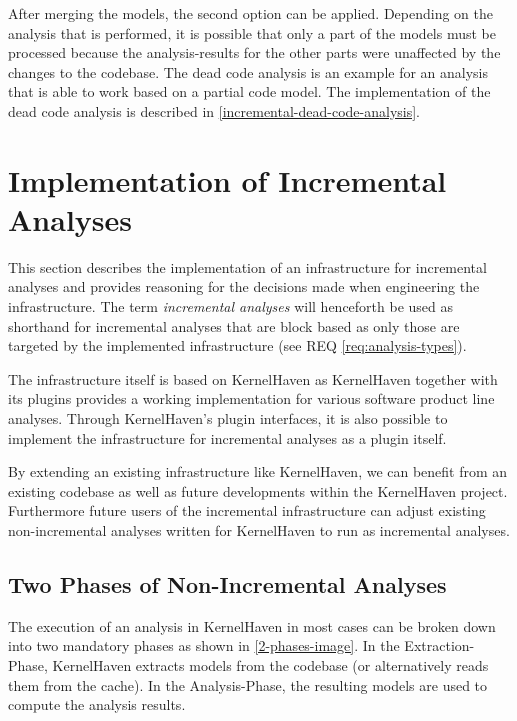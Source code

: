 \documentclass[a4paper]{article}
\begin{document}
After merging the models, the second option can be applied. Depending on the analysis that is performed, it is possible that only a part of the models must be processed because the analysis-results for the other parts were unaffected by the changes to the codebase. The dead code analysis is an example for an analysis that is able to work based on a partial code model. The implementation of the dead code analysis is described in \autoref{incremental-dead-code-analysis}.


\clearpage


\section{Implementation of Incremental Analyses}\label{implementation}

This section describes the implementation of an infrastructure for incremental analyses and provides reasoning for the decisions made when engineering the infrastructure. The term \emph{incremental analyses} will henceforth be used as shorthand for incremental analyses that are block based as only those are targeted by the implemented infrastructure (see REQ \ref{req:analysis-types}).

The infrastructure itself is based on KernelHaven \cite{KroeherEl-SharkawySchmid18} as KernelHaven together with its plugins provides a working implementation for various software product line analyses. Through KernelHaven's plugin interfaces, it is also possible to implement the infrastructure for incremental analyses as a plugin itself.

By extending an existing infrastructure like KernelHaven, we can benefit from an existing codebase as well as future developments within the KernelHaven project. Furthermore future users of the incremental infrastructure can adjust existing non-incremental analyses written for KernelHaven to run as incremental analyses.

\subsection{Two Phases of Non-Incremental Analyses}\label{2-phases}

The execution of an analysis in KernelHaven in most cases can be broken down into two mandatory phases as shown in \autoref{2-phases-image}. In the Extraction-Phase, KernelHaven extracts models from the codebase  (or alternatively reads them from the cache). In the Analysis-Phase, the resulting models are used to compute the analysis results.
\end{document}
